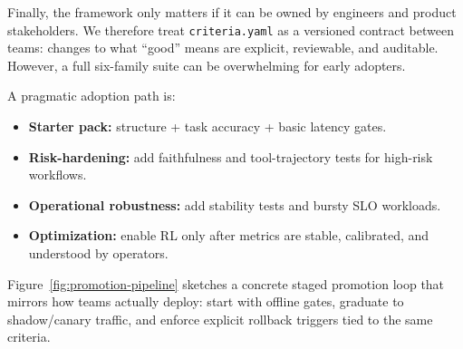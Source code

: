 \documentclass[11pt]{article}
\begin{document}
Finally, the framework only matters if it can be owned by engineers and product stakeholders.
We therefore treat \texttt{criteria.yaml} as a versioned contract between teams: changes to what ``good'' means are explicit, reviewable, and auditable.
However, a full six-family suite can be overwhelming for early adopters.

A pragmatic adoption path is:
\begin{itemize}[leftmargin=12pt]
    \item \textbf{Starter pack:} structure + task accuracy + basic latency gates.
    \item \textbf{Risk-hardening:} add faithfulness and tool-trajectory tests for high-risk workflows.
    \item \textbf{Operational robustness:} add stability tests and bursty SLO workloads.
    \item \textbf{Optimization:} enable RL only after metrics are stable, calibrated, and understood by operators.
\end{itemize}

Figure~\ref{fig:promotion-pipeline} sketches a concrete staged promotion loop that mirrors how teams actually deploy: start with offline gates, graduate to shadow/canary traffic, and enforce explicit rollback triggers tied to the same criteria.
\end{document}
